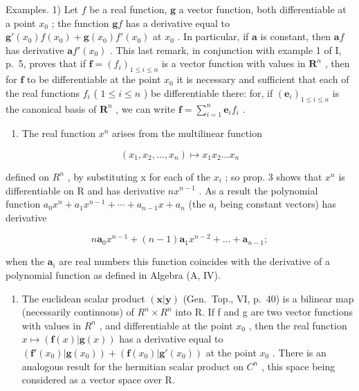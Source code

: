 Examples. 1) Let \(f\) be a real function, \(\mathbf{g}\) a vector function, both differentiable at a point \(x_0\) ; the function \(\mathbf{g}f\) has a derivative equal to \(\mathbf{g}'(x_0)f(x_0) + \mathbf{g}(x_0)f'(x_0)\) at \(x_0\) . In particular, if \(\mathbf{a}\) is constant, then \(\mathbf{a}f\) has derivative \(\mathbf{a}f'(x_0)\) . This last remark, in conjunction with example 1 of I, p.~5, proves that if \(\mathbf{f} = (f_i)_{1 \leqslant i \leqslant n}\) is a vector function with values in \(\mathbf{R}^n\) , then for \(\mathbf{f}\) to be differentiable at the point \(x_0\) it is necessary and sufficient that each of the real functions \(f_i\) ( \(1 \leqslant i \leqslant n\) ) be differentiable there: for, if \((\mathbf{e}_i)_{1 \leqslant i \leqslant n}\) is the canonical basis of \(\mathbf{R}^n\) , we can write \(\mathbf{f} = \sum_{i=1}^{n} \mathbf{e}_i f_i\) .

\begin{enumerate}
\def\labelenumi{\arabic{enumi})}
\setcounter{enumi}{1}
\tightlist
\item
  The real function \(x^{n}\) arises from the multilinear function
\end{enumerate}

\[
(x _ {1}, x _ {2}, \ldots , x _ {n}) \mapsto x _ {1} x _ {2} \ldots x _ {n}
\]

defined on \(R^{n}\) , by substituting x for each of the \(x_{i}\) ; so prop. 3 shows that \(x^{n}\) is differentiable on R and has derivative \(nx^{n-1}\) . As a result the polynomial function \(a_{0}x^{n} + a_{1}x^{n-1} + \cdots + a_{n-1}x + a_{n}\) (the \(a_{i}\) being constant vectors) has derivative

\[
n \mathbf {a} _ {0} x ^ {n - 1} + (n - 1) \mathbf {a} _ {1} x ^ {n - 2} + \dots + \mathbf {a} _ {n - 1};
\]

when the \(\mathbf{a}_i\) are real numbers this function coincides with the derivative of a polynomial function as defined in Algebra (A, IV).

\begin{enumerate}
\def\labelenumi{\arabic{enumi})}
\setcounter{enumi}{2}
\tightlist
\item
  The euclidean scalar product \((\mathbf{x}|\mathbf{y})\) (Gen.~Top., VI, p.~40) is a bilinear map (necessarily continuous) of \(R^{n}\times R^{n}\) into R. If f and g are two vector functions with values in \(R^{n}\) , and differentiable at the point \(x_{0}\) , then the real function \(x\mapsto(\mathbf{f}(x)|\mathbf{g}(x))\) has a derivative equal to \((\mathbf{f}'(x_{0})|\mathbf{g}(x_{0}))+(\mathbf{f}(x_{0})|\mathbf{g}'(x_{0}))\) at the point \(x_{0}\) . There is an analogous result for the hermitian scalar product on \(C^{n}\) , this space being considered as a vector space over R.
\end{enumerate}

